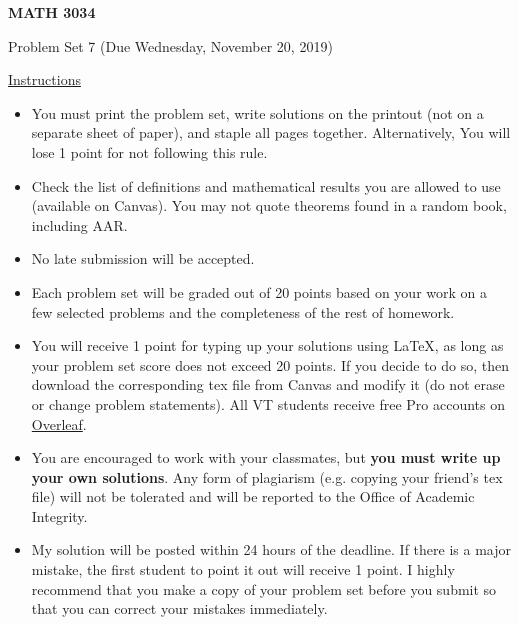 \documentclass[12pt]{amsart}
\begin{document}

\hfill{}

\vspace{0.3in}
\begin{center}
{\Large{\textbf{MATH 3034}}}

\vspace{0.1in}
{\large{Problem Set 7 (Due Wednesday, November 20, 2019)}}
\end{center}

\vspace{0.3in}
\noindent
\underline{Instructions}
\begin{itemize}
\vspace{0.1in}
\item You must print the problem set, write solutions on the printout (not on a separate sheet of paper), and staple all pages together.  Alternatively,  You will lose 1 point for not following this rule.
\vspace{0.1in}
\item Check the list of definitions and mathematical results you are allowed to use (available on Canvas).  You may not quote theorems found in a random book, including AAR.
\vspace{0.1in}
\item No late submission will be accepted.
\vspace{0.1in}
\item Each problem set will be graded out of 20 points based on your work on a few selected problems and the completeness of the rest of homework.
\vspace{0.1in}
\item You will receive 1 point for typing up your solutions using \LaTeX, as long as your problem set score does not exceed 20 points.  If you decide to do so, then download the corresponding tex file from Canvas and modify it (do not erase or change problem statements).  All VT students receive free Pro accounts on \href{https://www.overleaf.com/edu/vtech}{Overleaf}.
\vspace{0.1in}
\item You are encouraged to work with your classmates, but \textbf{you must write up your own solutions}.  Any form of plagiarism (e.g. copying your friend's tex file) will not be tolerated and will be reported to the Office of Academic Integrity.
\vspace{0.1in}
\item My solution will be posted within 24 hours of the deadline.  If there is a major mistake, the first student to point it out will receive 1 point.  I highly recommend that you make a copy of your problem set before you submit so that you can correct your mistakes immediately.
\end{itemize}
\end{document}
